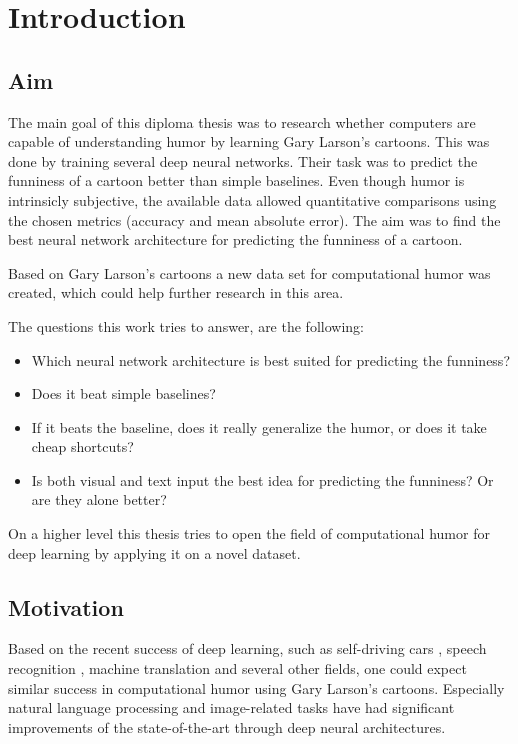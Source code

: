 \documentclass[draft,final,oneside]{vutinfth} %
\begin{document}
\chapter{Introduction}

\section{Aim} \label{aim}
The main goal of this diploma thesis was to research whether computers are capable of understanding humor by learning Gary Larson's cartoons. This was done by training several deep neural networks. Their task was to predict the funniness of a cartoon better than simple baselines. Even though humor is intrinsicly subjective, the available data allowed quantitative comparisons using the chosen metrics (accuracy and mean absolute error). The aim was to find the best neural network architecture for predicting the funniness of a cartoon.

Based on Gary Larson's cartoons a new data set for computational humor was created, which could help further research in this area.

The questions this work tries to answer, are the following:

\begin{itemize}
\item Which neural network architecture is best suited for predicting the funniness?
\item Does it beat simple baselines?
\item If it beats the baseline, does it really generalize the humor, or does it take cheap shortcuts?
\item Is both visual and text input the best idea for predicting the funniness? Or are they alone better?
\end{itemize}

On a higher level this thesis tries to open the field of computational humor for deep learning by applying it on a novel dataset.

\section{Motivation}

Based on the recent success of deep learning, such as self-driving cars \cite{selfdriving}, speech recognition \cite{speech}, machine translation \cite{nmt} and several other fields, one could expect similar success in computational humor using Gary Larson's cartoons. Especially natural language processing and image-related tasks have had significant improvements of the state-of-the-art through deep neural architectures.
\end{document}
